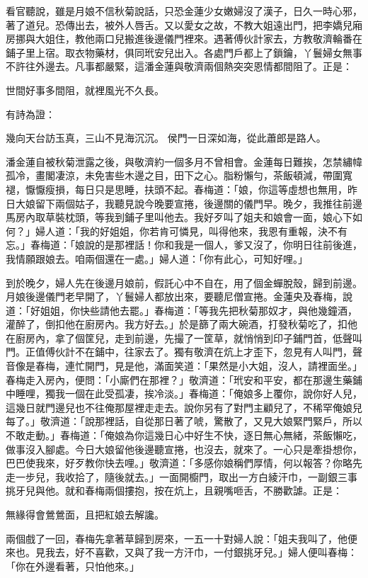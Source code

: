 看官聽說，雖是月娘不信秋菊說話，只恐金蓮少女嫩婦沒了漢子，日久一時心邪，著了道兒。恐傳出去，被外人唇舌。又以愛女之故，不教大姐遠出門，把李嬌兒廂房挪與大姐住，教他兩口兒搬進後邊儀門裡來。遇著傅伙計家去，方教敬濟輪番在鋪子里上宿。取衣物藥材，俱同玳安兒出入。各處門戶都上了鎖鑰，丫鬟婦女無事不許往外邊去。凡事都嚴緊，這潘金蓮與敬濟兩個熱突突恩情都間阻了。正是：

世間好事多間阻，就裡風光不久長。

有詩為證：

幾向天台訪玉真，三山不見海沉沉。
侯門一日深如海，從此蕭郎是路人。

潘金蓮自被秋菊泄露之後，與敬濟約一個多月不曾相會。金蓮每日難挨，怎禁繡幃孤冷，畫閣凄涼，未免害些木邊之目，田下之心。脂粉懶勻，茶飯頓減，帶圍寬褪，懨懨瘦損，每日只是思睡，扶頭不起。春梅道：「娘，你這等虛想也無用，昨日大娘留下兩個姑子，我聽見說今晚要宣捲，後邊關的儀門早。晚夕，我推往前邊馬房內取草裝枕頭，等我到鋪子里叫他去。我好歹叫了姐夫和娘會一面，娘心下如何？」婦人道：「我的好姐姐，你若肯可憐見，叫得他來，我恩有重報，決不有忘。」春梅道：「娘說的是那裡話！你和我是一個人，爹又沒了，你明日往前後進，我情願跟娘去。咱兩個還在一處。」婦人道：「你有此心，可知好哩。」

到於晚夕，婦人先在後邊月娘前，假託心中不自在，用了個金蟬脫殼，歸到前邊。月娘後邊儀門老早開了，丫鬟婦人都放出來，要聽尼僧宣捲。金蓮央及春梅，說道：「好姐姐，你快些請他去罷。」春梅道：「等我先把秋菊那奴才，與他幾鐘酒，灌醉了，倒扣他在廚房內。我方好去。」於是篩了兩大碗酒，打發秋菊吃了，扣他在廚房內，拿了個筐兒，走到前邊，先撮了一筐草，就悄悄到印子鋪門首，低聲叫門。正值傅伙計不在鋪中，往家去了。獨有敬濟在炕上才歪下，忽見有人叫門，聲音像是春梅，連忙開門，見是他，滿面笑道：「果然是小大姐，沒人，請裡面坐。」春梅走入房內，便問：「小廝們在那裡？」敬濟道：「玳安和平安，都在那邊生藥鋪中睡哩，獨我一個在此受孤凄，挨冷淡。」春梅道：「俺娘多上覆你，說你好人兒，這幾日就門邊兒也不往俺那屋裡走走去。說你另有了對門主顧兒了，不稀罕俺娘兒每了。」敬濟道：「說那裡話，自從那日著了唬，驚散了，又見大娘緊門緊戶，所以不敢走動。」春梅道：「俺娘為你這幾日心中好生不快，逐日無心無緒，茶飯懶吃，做事沒入腳處。今日大娘留他後邊聽宣捲，也沒去，就來了。一心只是牽掛想你，巴巴使我來，好歹教你快去哩。」敬濟道：「多感你娘稱們厚情，何以報答？你略先走一步兒，我收拾了，隨後就去。」一面開櫥門，取出一方白綾汗巾，一副銀三事挑牙兒與他。就和春梅兩個摟抱，按在炕上，且親嘴咂舌，不勝歡謔。正是：

無緣得會鶯鶯面，且把紅娘去解讒。

兩個戲了一回，春梅先拿著草歸到房來，一五一十對婦人說：「姐夫我叫了，他便來也。見我去，好不喜歡，又與了我一方汗巾，一付銀挑牙兒。」婦人便叫春梅：「你在外邊看著，只怕他來。」

